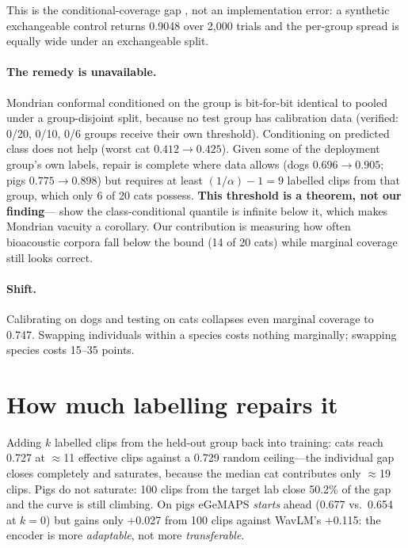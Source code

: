 \documentclass{article}
\begin{document}
This is the conditional-coverage gap \citep{barber2021}, not an implementation error: a synthetic
exchangeable control returns 0.9048 over 2{,}000 trials and the per-group spread is equally wide under
an exchangeable split.

\paragraph{The remedy is unavailable.} Mondrian conformal conditioned on the group is bit-for-bit
identical to pooled under a group-disjoint split, because no test group has calibration data
(verified: 0/20, 0/10, 0/6 groups receive their own threshold). Conditioning on predicted class does
not help (worst cat $0.412\to0.425$). Given some of the deployment group's own labels, repair is
complete where data allows (dogs $0.696\to0.905$; pigs $0.775\to0.898$) but requires at least
$(1/\alpha)-1 = 9$ labelled clips from that group, which only 6 of 20 cats possess. \textbf{This
threshold is a theorem, not our finding}---\citet{ding2023} show the class-conditional quantile is
infinite below it, which makes Mondrian vacuity a corollary. Our contribution is measuring how often
bioacoustic corpora fall below the bound (14 of 20 cats) while marginal coverage still looks correct.

\paragraph{Shift.} Calibrating on dogs and testing on cats collapses even marginal coverage to 0.747.
Swapping individuals within a species costs nothing marginally; swapping species costs 15--35 points.

\section{How much labelling repairs it}\label{sec:recovery}

Adding $k$ labelled clips from the held-out group back into training: cats reach 0.727 at
$\approx$11 effective clips against a 0.729 random ceiling---the individual gap closes completely and
saturates, because the median cat contributes only $\approx$19 clips. Pigs do not saturate: 100 clips
from the target lab close 50.2\% of the gap and the curve is still climbing. On pigs eGeMAPS
\emph{starts} ahead (0.677 vs.\ 0.654 at $k{=}0$) but gains only $+$0.027 from 100 clips against
WavLM's $+$0.115: the encoder is more \emph{adaptable}, not more \emph{transferable}.
\end{document}
